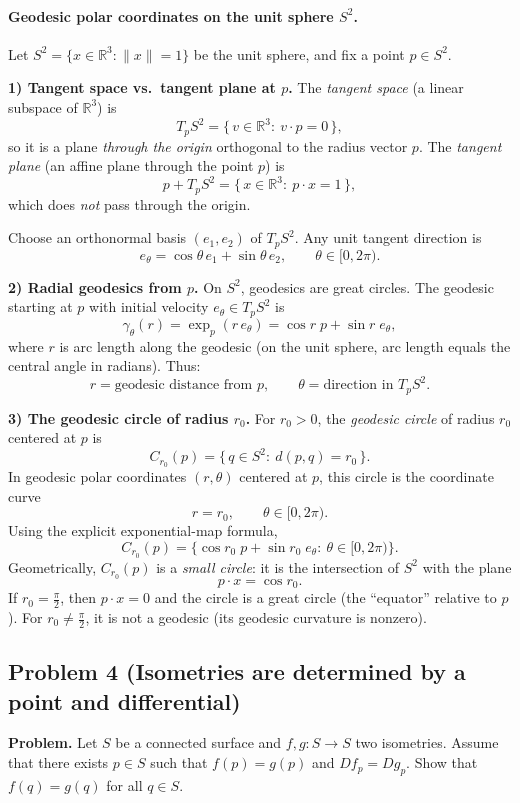 \documentclass[12pt,a4paper]{article}
\theoremstyle{plain}
\theoremstyle{definition}      %
\begin{document}
\paragraph{Geodesic polar coordinates on the unit sphere \(S^{2}\).}
Let \(S^{2}=\{x\in\mathbb{R}^{3}:\|x\|=1\}\) be the unit sphere, and fix a point \(p\in S^{2}\).

\medskip
\noindent\textbf{1) Tangent space vs.\ tangent plane at \(p\).}
The \emph{tangent space} (a linear subspace of \(\mathbb{R}^{3}\)) is
\[
T_{p}S^{2}=\{\,v\in\mathbb{R}^{3}:\ v\cdot p=0\,\},
\]
so it is a plane \emph{through the origin} orthogonal to the radius vector \(p\).
The \emph{tangent plane} (an affine plane through the point \(p\)) is
\[
p+T_{p}S^{2}=\{\,x\in\mathbb{R}^{3}:\ p\cdot x=1\,\},
\]
which does \emph{not} pass through the origin.

Choose an orthonormal basis \((e_{1},e_{2})\) of \(T_{p}S^{2}\). Any unit tangent direction is
\[
e_{\theta}=\cos\theta\,e_{1}+\sin\theta\,e_{2},\qquad \theta\in[0,2\pi).
\]

\medskip
\noindent\textbf{2) Radial geodesics from \(p\).}
On \(S^{2}\), geodesics are great circles. The geodesic starting at \(p\) with initial velocity
\(e_{\theta}\in T_{p}S^{2}\) is
\[
\gamma_{\theta}(r)=\exp_{p}(r\,e_{\theta})
=\cos r\;p+\sin r\;e_{\theta},
\]
where \(r\) is arc length along the geodesic (on the unit sphere, arc length equals the central angle in radians).
Thus:
\[
r=\text{geodesic distance from }p,\qquad
\theta=\text{direction in }T_{p}S^{2}.
\]

\medskip
\noindent\textbf{3) The geodesic circle of radius \(r_{0}\).}
For \(r_{0}>0\), the \emph{geodesic circle} of radius \(r_{0}\) centered at \(p\) is
\[
C_{r_{0}}(p)=\{\,q\in S^{2}:\ d(p,q)=r_{0}\,\}.
\]
In geodesic polar coordinates \((r,\theta)\) centered at \(p\), this circle is the coordinate curve
\[
r=r_{0},\qquad \theta\in[0,2\pi).
\]
Using the explicit exponential-map formula,
\[
C_{r_{0}}(p)=\bigl\{\cos r_{0}\;p+\sin r_{0}\;e_{\theta}:\ \theta\in[0,2\pi)\bigr\}.
\]
Geometrically, \(C_{r_{0}}(p)\) is a \emph{small circle}: it is the intersection of \(S^{2}\) with the plane
\[
p\cdot x=\cos r_{0}.
\]
If \(r_{0}=\frac{\pi}{2}\), then \(p\cdot x=0\) and the circle is a great circle (the ``equator'' relative to \(p\)).
For \(r_{0}\neq \frac{\pi}{2}\), it is not a geodesic (its geodesic curvature is nonzero).

\subsection*{Problem 4 (Isometries are determined by a point and differential)}
\textbf{Problem.}
Let $S$ be a connected surface and $f,g:S\to S$ two isometries.
Assume that there exists $p\in S$ such that $f(p)=g(p)$ and $Df_p=Dg_p$.
Show that $f(q)=g(q)$ for all $q\in S$.
\end{document}
